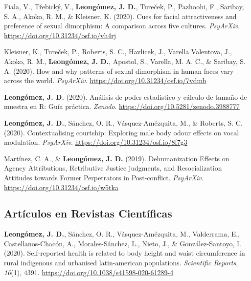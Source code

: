 \documentclass[11pt, a4paper]{awesome-cv}
\begin{document}
\leavevmode\hypertarget{ref-Fiala2020}{}%
Fiala, V., Třebický, V., \textbf{Leongómez, J. D.}, Tureček, P., Pazhoohi, F., Saribay, S. A., Akoko, R. M., \& Kleisner, K. (2020). Cues for facial attractiveness and preference of sexual dimorphism: A comparison across five cultures. \emph{PsyArXiv}. \url{https://doi.org/10.31234/osf.io/vh4rj}

\leavevmode\hypertarget{ref-Kleisner2020}{}%
Kleisner, K., Tureček, P., Roberts, S. C., Havlicek, J., Varella Valentova, J., Akoko, R. M., \textbf{Leongómez, J. D.}, Apostol, S., Varella, M. A. C., \& Saribay, S. A. (2020). How and why patterns of sexual dimorphism in human faces vary across the world. \emph{PsyArXiv}. \url{https://doi.org/10.31234/osf.io/7vdmb}

\leavevmode\hypertarget{ref-Leongomez2020a}{}%
\textbf{Leongómez, J. D.} (2020). Análisis de poder estadístico y cálculo de tamaño de muestra en R: Guía práctica. \emph{Zenodo}. \url{https://doi.org/10.5281/zenodo.3988777}

\leavevmode\hypertarget{ref-Leongomez2020}{}%
\textbf{Leongómez, J. D.}, Sánchez, O. R., Vásquez-Amézquita, M., \& Roberts, S. C. (2020). Contextualising courtship: Exploring male body odour effects on vocal modulation. \emph{PsyArXiv}. \url{https://doi.org/10.31234/osf.io/8f7g3}

\leavevmode\hypertarget{ref-Martinez2019}{}%
Martínez, C. A., \& \textbf{Leongómez, J. D.} (2019). Dehumanization Effects on Agency Attributions, Retributive Justice judgments, and Resocialization Attitudes towards Former Perpetrators in Post-conflict. \emph{PsyArXiv}. \url{https://doi.org/10.31234/osf.io/w5tka}

\endgroup

\hypertarget{artuxedculos-en-revistas-cientuxedficas}{%
\subsection{Artículos en Revistas Científicas}\label{artuxedculos-en-revistas-cientuxedficas}}

\begingroup
\setlength{\parindent}{-0.5in}
\setlength{\leftskip}{0.5in}

\hypertarget{refs_journals}{}
\leavevmode\hypertarget{ref-Leonguxf3mez2020}{}%
\textbf{Leongómez, J. D.}, Sánchez, O. R., Vásquez-Amézquita, M., Valderrama, E., Castellanos-Chacón, A., Morales-Sánchez, L., Nieto, J., \& González-Santoyo, I. (2020). Self-reported health is related to body height and waist circumference in rural indigenous and urbanised latin-american populations. \emph{Scientific Reports}, \emph{10}(1), 4391. \url{https://doi.org/10.1038/s41598-020-61289-4}
\end{document}
